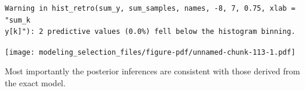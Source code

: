 \documentclass[
  letterpaper,
  DIV=11,
  numbers=noendperiod]{scrartcl}
\newenvironment{Shaded}{\begin{snugshade}}{\end{snugshade}}
\newcommand{\AttributeTok}[1]{\textcolor[rgb]{0.40,0.45,0.13}{#1}}
\newcommand{\ControlFlowTok}[1]{\textcolor[rgb]{0.00,0.23,0.31}{#1}}
\newcommand{\DecValTok}[1]{\textcolor[rgb]{0.68,0.00,0.00}{#1}}
\newcommand{\FloatTok}[1]{\textcolor[rgb]{0.68,0.00,0.00}{#1}}
\newcommand{\FunctionTok}[1]{\textcolor[rgb]{0.28,0.35,0.67}{#1}}
\newcommand{\NormalTok}[1]{\textcolor[rgb]{0.00,0.23,0.31}{#1}}
\newcommand{\OtherTok}[1]{\textcolor[rgb]{0.00,0.23,0.31}{#1}}
\newcommand{\SpecialCharTok}[1]{\textcolor[rgb]{0.37,0.37,0.37}{#1}}
\newcommand{\StringTok}[1]{\textcolor[rgb]{0.13,0.47,0.30}{#1}}
\begin{document}
\begin{Shaded}
\end{Shaded}

\begin{verbatim}
Warning in hist_retro(sum_y, sum_samples, names, -8, 7, 0.75, xlab = "sum_k
y[k]"): 2 predictive values (0.0%) fell below the histogram binning.
\end{verbatim}

\texttt{[image: modeling\_selection\_files/figure-pdf/unnamed-chunk-113-1.pdf]}

Most importantly the posterior inferences are consistent with those
derived from the exact model.
\end{document}
